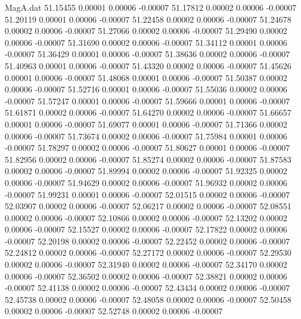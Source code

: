 \begin{filecontents}{MagA.dat}
  51.15455    0.00001    0.00006   -0.00007
  51.17812    0.00002    0.00006   -0.00007
  51.20119    0.00001    0.00006   -0.00007
  51.22458    0.00002    0.00006   -0.00007
  51.24678    0.00002    0.00006   -0.00007
  51.27066    0.00002    0.00006   -0.00007
  51.29490    0.00002    0.00006   -0.00007
  51.31690    0.00002    0.00006   -0.00007
  51.34112    0.00001    0.00006   -0.00007
  51.36429    0.00001    0.00006   -0.00007
  51.38636    0.00002    0.00006   -0.00007
  51.40963    0.00001    0.00006   -0.00007
  51.43320    0.00002    0.00006   -0.00007
  51.45626    0.00001    0.00006   -0.00007
  51.48068    0.00001    0.00006   -0.00007
  51.50387    0.00002    0.00006   -0.00007
  51.52716    0.00001    0.00006   -0.00007
  51.55036    0.00002    0.00006   -0.00007
  51.57247    0.00001    0.00006   -0.00007
  51.59666    0.00001    0.00006   -0.00007
  51.61871    0.00002    0.00006   -0.00007
  51.64270    0.00002    0.00006   -0.00007
  51.66657    0.00001    0.00006   -0.00007
  51.69077    0.00001    0.00006   -0.00007
  51.71366    0.00002    0.00006   -0.00007
  51.73674    0.00002    0.00006   -0.00007
  51.75984    0.00001    0.00006   -0.00007
  51.78297    0.00002    0.00006   -0.00007
  51.80627    0.00001    0.00006   -0.00007
  51.82956    0.00002    0.00006   -0.00007
  51.85274    0.00002    0.00006   -0.00007
  51.87583    0.00002    0.00006   -0.00007
  51.89994    0.00002    0.00006   -0.00007
  51.92325    0.00002    0.00006   -0.00007
  51.94629    0.00002    0.00006   -0.00007
  51.96932    0.00002    0.00006   -0.00007
  51.99231    0.00001    0.00006   -0.00007
  52.01515    0.00002    0.00006   -0.00007
  52.03907    0.00002    0.00006   -0.00007
  52.06217    0.00002    0.00006   -0.00007
  52.08551    0.00002    0.00006   -0.00007
  52.10866    0.00002    0.00006   -0.00007
  52.13202    0.00002    0.00006   -0.00007
  52.15527    0.00002    0.00006   -0.00007
  52.17822    0.00002    0.00006   -0.00007
  52.20198    0.00002    0.00006   -0.00007
  52.22452    0.00002    0.00006   -0.00007
  52.24812    0.00002    0.00006   -0.00007
  52.27172    0.00002    0.00006   -0.00007
  52.29530    0.00002    0.00006   -0.00007
  52.31940    0.00002    0.00006   -0.00007
  52.34170    0.00002    0.00006   -0.00007
  52.36502    0.00002    0.00006   -0.00007
  52.38821    0.00002    0.00006   -0.00007
  52.41138    0.00002    0.00006   -0.00007
  52.43434    0.00002    0.00006   -0.00007
  52.45738    0.00002    0.00006   -0.00007
  52.48058    0.00002    0.00006   -0.00007
  52.50458    0.00002    0.00006   -0.00007
  52.52748    0.00002    0.00006   -0.00007

\end{filecontents}
